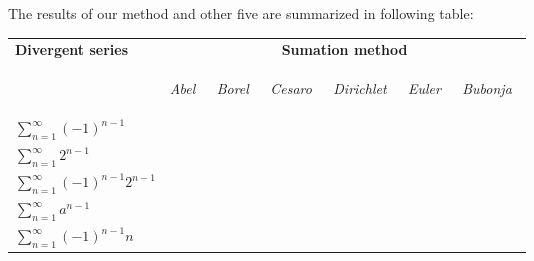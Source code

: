 \documentclass[12pt]{article}
\newcommand{\cmark}{\ding{51}}
\newcommand{\xmark}{\ding{55}}
\begin{document}
The results of our method and other five are summarized in following table:\\

\begin{tabular}{|l|c|c|c|c|c|c|}\hline
\multirow{2}{*}{\bf Divergent series} & \multicolumn{6}{|c|}{\bf Sumation method}\\ \cline{2-7}
 & \multicolumn{1}{|c|}{\begin{sideways}\it Abel \,\end{sideways}} & \multicolumn{1}{|c|}{\begin{sideways}\it Borel \,\end{sideways}} & \multicolumn{1}{|c|}{\begin{sideways}\it Cesaro \,\end{sideways}} & \multicolumn{1}{|c|}{\begin{sideways}\it Dirichlet \,\end{sideways}} & \multicolumn{1}{|c|}{\begin{sideways}\it Euler \,\end{sideways}} & \multicolumn{1}{|c|}{\begin{sideways}\it Bubonja \,\end{sideways}} \\ \hline
 
$\sum_{n=1}^{\infty} (-1)^{n-1}$ & \textcolor{Green}{\cmark} & \textcolor{Green}{\cmark} & \textcolor{Green}{\cmark} & \textcolor{Green}{\cmark} & \textcolor{Green}{\cmark} & \textcolor{Green}{\cmark} \\ \hline

$\sum_{n=1}^{\infty} 2^{n-1}$ & \textcolor{Red}{\xmark} & \textcolor{Green}{\cmark} & \textcolor{Red}{\xmark} & \textcolor{Red}{\xmark} & \textcolor{Red}{\xmark} & \textcolor{Green}{\cmark} \\ \hline

$\sum_{n=1}^{\infty} (-1)^{n-1} 2^{n-1}$ & \textcolor{Red}{\xmark} & \textcolor{Green}{\cmark} & \textcolor{Red}{\xmark} & \textcolor{Red}{\xmark} & \textcolor{Green}{\cmark} & \textcolor{Green}{\cmark} \\ \hline

$\sum_{n=1}^{\infty} a^{n-1}$ & \textcolor{Red}{\xmark} & \textcolor{Green}{\cmark} & \textcolor{Red}{\xmark} & \textcolor{Red}{\xmark} & \textcolor{Red}{\xmark} & \textcolor{Green}{\cmark} \\ \hline

$\sum_{n=1}^{\infty} (-1)^{n-1} n$ & \textcolor{Green}{\cmark} & \textcolor{Green}{\cmark} & \textcolor{Red}{\xmark} & \textcolor{Green}{\cmark} & \textcolor{Green}{\cmark} & \textcolor{Green}{\cmark} \\ \hline


\end{tabular}
\end{document}
